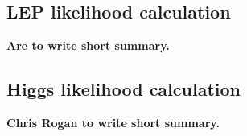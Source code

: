 \subsection{LEP likelihood calculation}
\textbf{Are to write short summary.}

\subsection{Higgs likelihood calculation}
\textbf{Chris Rogan to write short summary.}
